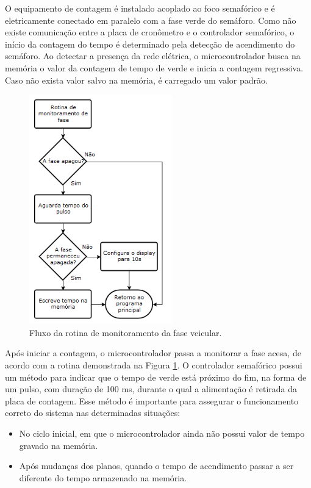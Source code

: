 O equipamento de contagem é instalado acoplado ao foco semafórico e é eletricamente conectado em paralelo com a fase verde do semáforo. Como não existe comunicação entre a placa de cronômetro e o controlador semafórico, o início da contagem do tempo é determinado pela detecção de acendimento do semáforo. Ao detectar a presença da rede elétrica, o microcontrolador busca na memória o valor da contagem de tempo de verde e inicia a contagem regressiva. Caso não exista valor salvo na memória, é carregado um valor padrão.

\begin{figure}[ht]
    \begin{center}
    \includegraphics{figuras/fluxo_cron2.PNG}
    \end{center}
    \caption[Fluxograma do monitoramento do cronômetro]{Fluxo da rotina de monitoramento da fase veicular.}
    \label{fluxo_cron2}
\end{figure}

Após iniciar a contagem, o microcontrolador passa a monitorar a fase acesa, de acordo com a rotina demonstrada na Figura \ref{fluxo_cron2}. O controlador semafórico possui um método para indicar que o tempo de verde está próximo do fim, na forma de um pulso, com duração de 100 ms, durante o qual a alimentação é retirada da placa de contagem. Esse método é importante para assegurar o funcionamento correto do sistema nas determinadas situações:

\begin{itemize}
\item No ciclo inicial, em que o microcontrolador ainda não possui valor de tempo gravado na memória.
\item Após mudanças dos planos, quando o tempo de acendimento passar a ser diferente do tempo armazenado na memória.
\end{itemize}

